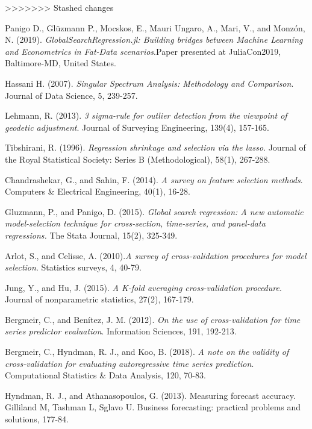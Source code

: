 \documentclass{article}
\begin{document}
>>>>>>> Stashed changes
  
\begin{thebibliography}{1}

Panigo D., Glüzmann P., Mocskos, E., Mauri Ungaro, A., Mari, V., and Monzón, N. (2019). \textit{GlobalSearchRegression.jl: Building bridges between Machine Learning and Econometrics in Fat-Data scenarios}.Paper presented at JuliaCon2019, Baltimore-MD, United States.

Hassani H. (2007). \textit{Singular Spectrum Analysis: Methodology and Comparison}. Journal of Data Science, 5, 239-257.

Lehmann, R. (2013). \textit{3 sigma-rule for outlier detection from the viewpoint of geodetic adjustment}. Journal of Surveying Engineering, 139(4), 157-165.

Tibshirani, R. (1996). \textit{Regression shrinkage and selection via the lasso}. Journal of the Royal Statistical Society: Series B (Methodological), 58(1), 267-288.

Chandrashekar, G., and Sahin, F. (2014). \textit{A survey on feature selection methods}. Computers & Electrical Engineering, 40(1), 16-28.

Gluzmann, P., and Panigo, D. (2015). \textit{Global search regression: A new automatic model-selection technique for cross-section, time-series, and panel-data regressions.} The Stata Journal, 15(2), 325-349.

Arlot, S., and Celisse, A. (2010).\textit{A survey of cross-validation procedures for model selection}. Statistics surveys, 4, 40-79.

Jung, Y., and Hu, J. (2015). \textit{A K-fold averaging cross-validation procedure}. Journal of nonparametric statistics, 27(2), 167-179.

Bergmeir, C., and Benítez, J. M. (2012). \textit{On the use of cross-validation for time series predictor evaluation}. Information Sciences, 191, 192-213.

Bergmeir, C., Hyndman, R. J., and Koo, B. (2018). \textit{A note on the validity of cross-validation for evaluating autoregressive time series prediction}. Computational Statistics & Data Analysis, 120, 70-83.

Hyndman, R. J., and Athanasopoulos, G. (2013). Measuring forecast accuracy. Gilliland M, Tashman L, Sglavo U. Business forecasting: practical problems and solutions, 177-84.

\end{thebibliography}
\end{document}
